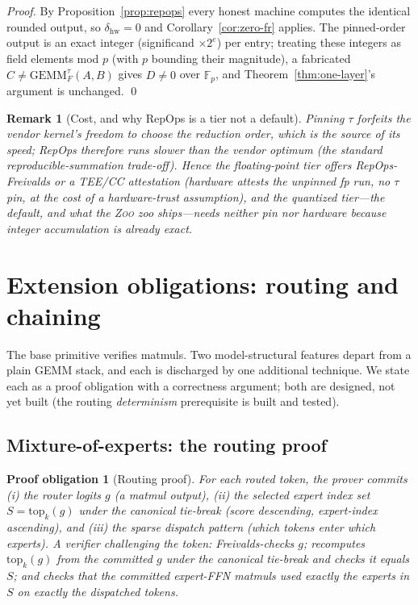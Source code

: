 \documentclass[11pt]{article}
\newtheorem{remark}{Remark}
\newtheorem{obligation}{Proof obligation}
\newcommand{\Zoo}{\textsc{Zoo}}
\newcommand{\F}{\mathbb{F}}
\newcommand{\GEMM}{\mathrm{GEMM}}
\begin{document}
\begin{proof}
By Proposition~\ref{prop:repops} every honest machine computes the identical rounded output,
so $\delta_{\mathrm{hw}} = 0$ and Corollary~\ref{cor:zero-fr} applies. The pinned-order output
is an exact integer (significand $\times 2^e$) per entry; treating these integers as field
elements mod $p$ (with $p$ bounding their magnitude), a fabricated $\hat C \ne
\GEMM_F^{\tau}(A,B)$ gives $D \ne 0$ over $\F_p$, and Theorem~\ref{thm:one-layer}'s argument is
unchanged. \qed
\end{proof}

\begin{remark}[Cost, and why RepOps is a tier not a default]
Pinning $\tau$ forfeits the vendor kernel's freedom to choose the reduction order, which is the
source of its speed; RepOps therefore runs slower than the vendor optimum (the standard
reproducible-summation trade-off). Hence the floating-point tier offers RepOps-Freivalds
\emph{or} a TEE/CC attestation (hardware attests the unpinned fp run, no $\tau$ pin, at the
cost of a hardware-trust assumption), and the quantized tier---the default, and what the \Zoo{}
zoo ships---needs neither pin nor hardware because integer accumulation is already exact.
\end{remark}

\section{Extension obligations: routing and chaining}
\label{sec:extensions}

The base primitive verifies matmuls. Two model-structural features depart from a plain GEMM
stack, and each is discharged by one additional technique. We state each as a proof obligation
with a correctness argument; both are designed, not yet built (the routing \emph{determinism}
prerequisite is built and tested).

\subsection{Mixture-of-experts: the routing proof}

\begin{obligation}[Routing proof]
\label{obl:routing}
For each routed token, the prover commits (i) the router logits $g$ (a matmul output), (ii) the
selected expert index set $S = \mathrm{top}_k(g)$ under the canonical tie-break
\textup{(}score descending, expert-index ascending\textup{)}, and (iii) the sparse dispatch
pattern (which tokens enter which experts). A verifier challenging the token: Freivalds-checks
$g$; recomputes $\mathrm{top}_k(g)$ from the committed $g$ under the canonical tie-break and
checks it equals $S$; and checks that the committed expert-FFN matmuls used exactly the experts
in $S$ on exactly the dispatched tokens.
\end{obligation}
\end{document}
